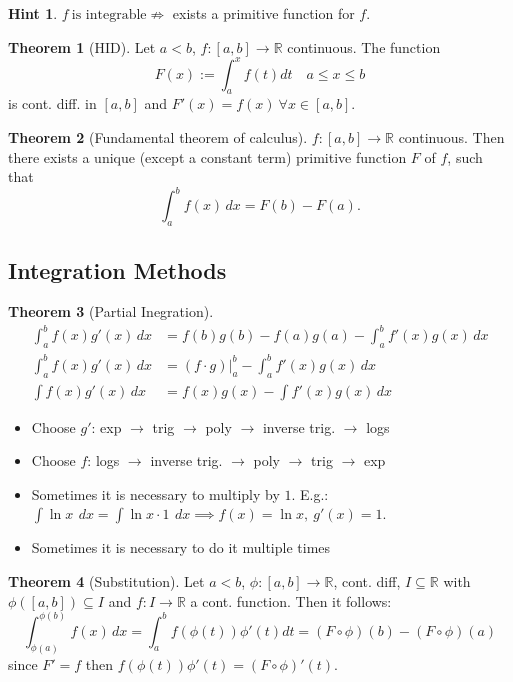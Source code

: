 \documentclass[a4paper, 10pt]{article}
\theoremstyle{definition}
\newtheorem*{note_wrapper}{Hint}
\theoremstyle{named}
\newtheorem*{ntheorem_wrapper}{Theorem}
\newenvironment{ntheorem}%
    {\begin{mdframed}[style=important]\begin{ntheorem_wrapper}}%
    {\end{ntheorem_wrapper}\end{mdframed}}
\newenvironment{note}%
    {\begin{mdframed}[style=trick]\begin{note_wrapper}}%
    {\end{note_wrapper}\end{mdframed}}
\newcommand{\R}{\mathbb{R}}
\begin{document}
\begin{note}
    $f \ \text{is integrable} \not\Rightarrow$ exists a primitive function for $f$.
\end{note}

\begin{ntheorem}[HID]
    Let $a < b$, $f: [a, b] \to \R$ continuous. The function 
    $$F(x) := \int_a^x f(t) dt \quad a \leq x \leq b$$
    is cont. diff. in $[a, b]$ and $F'(x) = f(x) \ \forall x \in [a, b]$.
\end{ntheorem}

\begin{ntheorem}[Fundamental theorem of calculus]
    $f: [a, b] \to \R$ continuous. Then there exists a unique (except a constant term) primitive function $F$ of $f$, such that 
    $$\int_a^b f(x) \,dx = F(b) - F(a).$$
\end{ntheorem}

\pagebreak
\subsection{Integration Methods}
\begin{ntheorem}[Partial Inegration]
    \begin{align*}
        \int_a^b f(x) g'(x) \,dx &= f(b)g(b) - f(a)g(a) - \int_a^b f'(x)g(x) \,dx \\
        \int_a^b f(x) g'(x) \,dx &= (f \cdot g)|_a^b - \int_a^b f'(x)g(x) \,dx \\
        \int f(x)g'(x) \,dx &= f(x) g(x) - \int f'(x) g(x) \,dx
    \end{align*}
\end{ntheorem}
\begin{itemize}
    \item Choose $g'$: exp $\rightarrow$ trig $\rightarrow$ poly $\rightarrow$ inverse trig. $\rightarrow$ logs
    \item Choose $f$: logs $\rightarrow$ inverse trig. $\rightarrow$ poly $\rightarrow$ trig $\rightarrow$ exp
    \item Sometimes it is necessary to multiply by $1$. E.g.: $\int \ln x \ \,dx = \int \ln x \cdot 1 \ \,dx \implies f(x) = \ln x, \ g'(x) = 1$.
    \item Sometimes it is necessary to do it multiple times
\end{itemize}

\begin{ntheorem}[Substitution]
    Let $a < b$, $\phi: [a, b] \to \R$, cont. diff, $I \subseteq \R$ with $\phi([a, b]) \subseteq I$ and $f: I \to \R$ a cont. function. Then it follows:
    $$\int_{\phi(a)}^{\phi(b)} f(x) \,dx = \int_a^b f(\phi(t)) \phi'(t) dt = (F \circ \phi)(b) - (F \circ \phi)(a)$$
    since $F'=f$ then $f(\phi(t))\phi'(t) = (F \circ \phi)'(t)$.
\end{ntheorem}
\end{document}

